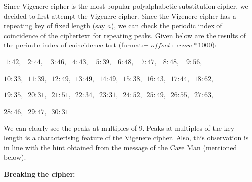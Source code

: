 \documentclass[11pt]{article}
\begin{document}
Since Vigenere cipher is the most popular polyalphabetic substitution cipher, we decided to first attempt the Vigenere cipher. Since the Vigenere cipher has a repeating key of fixed length (say $n$), we can check the periodic index of coincidence of the ciphertext for repeating peaks. Given below are the results of the periodic index of coincidence test (format:= $offset\ :\ score*1000$):
\medskip

$\ 1  : 42,\ $
$\ 2  : 44,\ $
$\ \ 3  : 46,\ $
$\ 4  : 43,\ $
$\ \ 5  : 39,\ $
$\ 6  : 48,\ $
$\ \ 7  : 47,\ $
$\ 8  : 48,\ $
$\ \ 9  : 56,\ $

$10 : 33,\ $
$11 : 39,\ $
$12 : 49,\ $
$13 : 49,\ $
$14 : 49,\ $
$15 : 38,\ $
$16 : 43,\ $
$17 : 44,\ $
$18 : 62,\ $

$19 : 35,\ $
$20 : 31,\ $
$21 : 51,\ $
$22 : 34,\ $
$23 : 31,\ $
$24 : 52,\ $
$25 : 49,\ $
$26 : 55,\ $
$27 : 63,\ $

$28 : 46,\ $
$29 : 47,\ $
$30 : 31\ $

\medskip

We can clearly see the peaks at multiples of 9. Peaks at multiples of the key length is a characterising feature of the Vigenere cipher. Also, this observation is in line with the hint obtained from the message of the Cave Man (mentioned below).

\pagebreak

\textbf{Breaking the cipher: }
\end{document}
